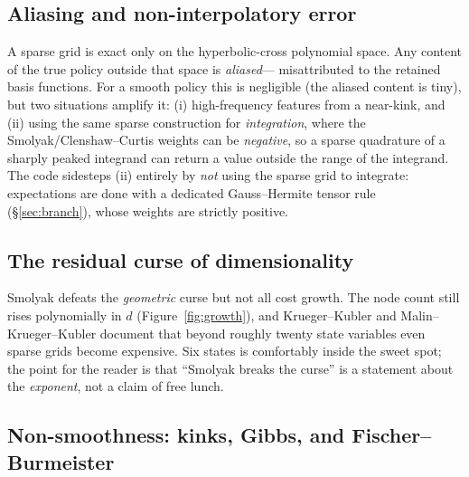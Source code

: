 \documentclass[11pt]{article}
\begin{document}
\subsection{Aliasing and non-interpolatory error}

A sparse grid is exact only on the hyperbolic-cross polynomial space. Any
content of the true policy outside that space is \emph{aliased}---
misattributed to the retained basis functions. For a smooth policy this is
negligible (the aliased content is tiny), but two situations amplify it:
(i) high-frequency features from a near-kink, and (ii) using the same sparse
construction for \emph{integration}, where the Smolyak/Clenshaw--Curtis
weights can be \emph{negative}, so a sparse quadrature of a sharply peaked
integrand can return a value outside the range of the integrand. The code
sidesteps (ii) entirely by \emph{not} using the sparse grid to integrate:
expectations are done with a dedicated Gauss--Hermite tensor rule
(\S\ref{sec:branch}), whose weights are strictly positive.

\subsection{The residual curse of dimensionality}

Smolyak defeats the \emph{geometric} curse but not all cost growth. The node
count still rises polynomially in $d$ (Figure~\ref{fig:growth}), and
Krueger--Kubler and Malin--Krueger--Kubler document that beyond roughly
twenty state variables even sparse grids become expensive. Six states is
comfortably inside the sweet spot; the point for the reader is that
``Smolyak breaks the curse'' is a statement about the \emph{exponent}, not a
claim of free lunch.

\subsection{Non-smoothness: kinks, Gibbs, and Fischer--Burmeister}
\label{sec:risk-kink}
\end{document}

